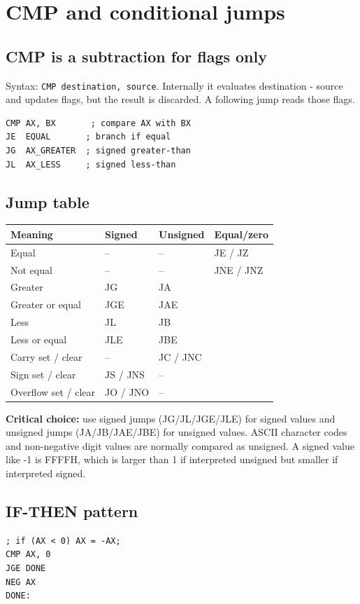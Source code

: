 \documentclass[11pt,a4paper]{article}
\begin{document}
\section{CMP and conditional jumps}
\subsection{CMP is a subtraction for flags only}
Syntax: \texttt{CMP destination, source}. Internally it evaluates destination - source and updates flags, but the result is discarded. A following jump reads those flags.
\begin{lstlisting}[style=asm]
CMP AX, BX       ; compare AX with BX
JE  EQUAL       ; branch if equal
JG  AX_GREATER  ; signed greater-than
JL  AX_LESS     ; signed less-than
\end{lstlisting}

\subsection{Jump table}
\begin{longtable}{llll}
\toprule \textbf{Meaning} & \textbf{Signed} & \textbf{Unsigned} & \textbf{Equal/zero}\\
\midrule
Equal & -- & -- & JE / JZ\\
Not equal & -- & -- & JNE / JNZ\\
Greater & JG & JA & \\
Greater or equal & JGE & JAE & \\
Less & JL & JB & \\
Less or equal & JLE & JBE & \\
Carry set / clear & -- & JC / JNC & \\
Sign set / clear & JS / JNS & -- & \\
Overflow set / clear & JO / JNO & -- & \\
\bottomrule
\end{longtable}
\textbf{Critical choice:} use signed jumps (JG/JL/JGE/JLE) for signed values and unsigned jumps (JA/JB/JAE/JBE) for unsigned values. ASCII character codes and non-negative digit values are normally compared as unsigned. A signed value like -1 is FFFFH, which is larger than 1 if interpreted unsigned but smaller if interpreted signed.

\subsection{IF-THEN pattern}
\begin{lstlisting}[style=asm]
; if (AX < 0) AX = -AX;
CMP AX, 0
JGE DONE
NEG AX
DONE:
\end{lstlisting}
\end{document}
